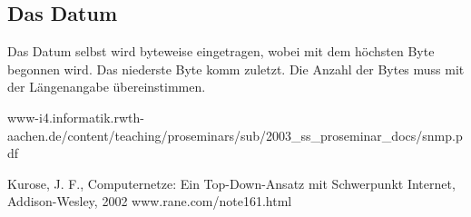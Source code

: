 \documentclass[11pt,a4paper]{article}
\begin{document}
\subsection*{Das Datum}
Das Datum selbst wird byteweise eingetragen, wobei mit dem höchsten Byte begonnen wird. Das niederste Byte komm zuletzt. Die Anzahl der Bytes muss mit der Längenangabe übereinstimmen.

\pagebreak
\begin{thebibliography}{10}
	\begin{small}
		www-i4.informatik.rwth-aachen.de/content/teaching/proseminars/sub/2003\_ss\_proseminar\_docs/snmp.pdf
	\end{small}
		Kurose, J. F.,
		Computernetze: Ein Top-Down-Ansatz mit Schwerpunkt Internet,
		Addison-Wesley,
		2002
		www.rane.com/note161.html
\end{thebibliography}
\end{document}
